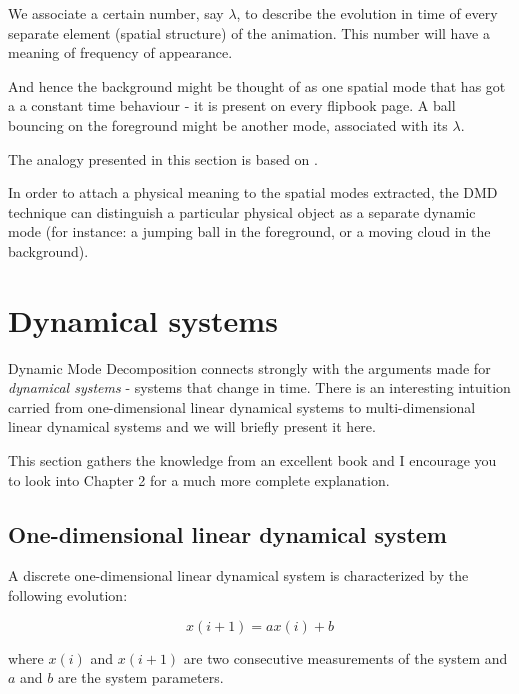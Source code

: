 \documentclass[10pt,twocolumn]{article}
\begin{document}
We associate a certain number, say $\lambda$, to describe the evolution in time of every separate element (spatial structure) of the animation. This number will have a meaning of frequency of appearance.

And hence the background might be thought of as one spatial mode that has got a a constant time behaviour - it is present on every flipbook page. A ball bouncing on the foreground might be another mode, associated with its $\lambda$. 

The analogy presented in this section is based on \cite{Grosek}.

In order to attach a physical meaning to the spatial modes extracted, the DMD technique can distinguish a particular physical object as a separate dynamic mode (for instance: a jumping ball in the foreground, or a moving cloud in the background).

\section{Dynamical systems}

Dynamic Mode Decomposition connects strongly with the arguments made for \textit{dynamical systems} - systems that change in time. There is an interesting intuition carried from one-dimensional linear dynamical systems to multi-dimensional linear dynamical systems and we will briefly present it here.

This section gathers the knowledge from an excellent book \cite{Prof_Edward_Scheinerman} and I encourage you to look into Chapter 2 for a much more complete explanation.


\subsection{One-dimensional linear dynamical system}

A discrete one-dimensional linear dynamical system is characterized by the following evolution:

\begin{equation}
x(i+1) = a x(i) + b
\end{equation}

where $x(i)$ and $x(i+1)$ are two consecutive measurements of the system and $a$ and $b$ are the system parameters.
\end{document}
